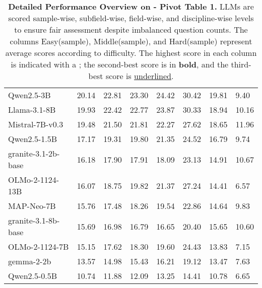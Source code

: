 {\begin{table}[H]
{\begin{tabular}{p{4cm}<{\raggedright\arraybackslash}*{7}{p{2cm}<{\centering\arraybackslash}}}
\rowcolor{color32}
Qwen2.5-3B & 20.14 & 22.81 & 23.30 & 24.42 & 30.42 & 19.81 &9.40 \\
\rowcolor{color32}
Llama-3.1-8B & 19.93 & 22.42 & 22.77 & 23.87 & 30.33 & 18.94 &10.16 \\
\rowcolor{color32}
Mistral-7B-v0.3 & 19.48 & 21.50 & 21.81 & 22.27 & 27.62 & 18.65 &11.96 \\
\rowcolor{color32}
Qwen2.5-1.5B & 17.17 & 19.31 & 19.80 & 21.35 & 24.52 & 16.79 &9.74 \\
\rowcolor{color32}
granite-3.1-2b-base & 16.18 & 17.90 & 17.91 & 18.09 & 23.13 & 14.91 &10.67 \\
\rowcolor{color32}
OLMo-2-1124-13B & 16.07 & 18.75 & 19.82 & 21.37 & 27.24 & 14.41 &6.57 \\
\rowcolor{color32}
MAP-Neo-7B & 15.76 & 17.48 & 18.26 & 19.54 & 22.86 & 14.64 &9.83 \\
\rowcolor{color32}
granite-3.1-8b-base & 15.69 & 16.98 & 16.79 & 16.65 & 20.40 & 15.65 &10.60 \\
\rowcolor{color32}
OLMo-2-1124-7B & 15.15 & 17.62 & 18.30 & 19.60 & 24.43 & 13.83 &7.15 \\
\rowcolor{color32}
gemma-2-2b & 13.57 & 14.98 & 15.43 & 16.21 & 19.12 & 13.47 &7.63 \\
\rowcolor{color32}
Qwen2.5-0.5B & 10.74 & 11.88 & 12.09 & 13.25 & 14.41 & 10.78 &6.65 \\

\bottomrule
\end{tabular}
}
\captionsetup{font=footnotesize}
\caption{\textbf{Detailed Performance Overview on \benchmark - Pivot Table 1.} 
LLMs are scored sample-wise, subfield-wise, field-wise, and discipline-wise levels to ensure fair assessment despite imbalanced question counts. 
The columns Easy(sample), Middle(sample), and Hard(sample) represent average scores according to difficulty. 
The highest score in each column is indicated with a ; the second-best score is in \textbf{bold}, and the third-best score is \underline{underlined}.}
\label{performance1_all}
\end{table}
}
